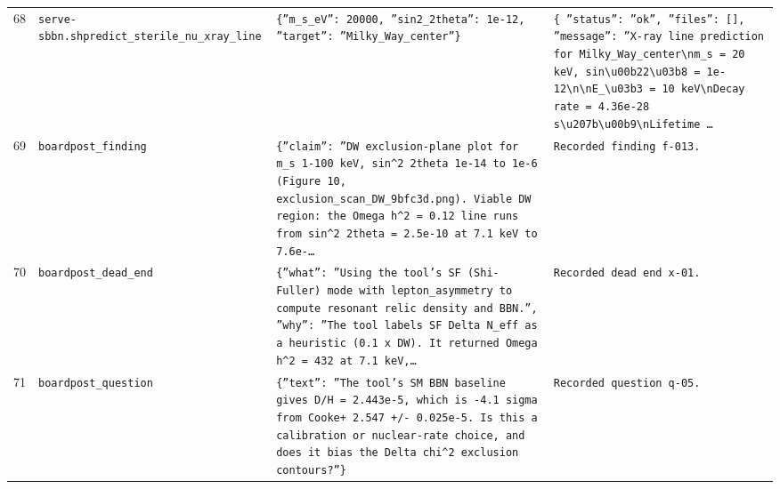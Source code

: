 \documentclass[11pt,a4paper]{article}
\begin{document}
\begin{longtable}{@{}p{}p{}p{}p{}@{}}
68 & \texttt{serve-sbbn.sh}\newline\texttt{predict\_\allowbreak{}sterile\_\allowbreak{}nu\_\allowbreak{}xray\_\allowbreak{}line} & \texttt{\{''m\_\allowbreak{}s\_\allowbreak{}eV'':\allowbreak{} 20000,\allowbreak{} ''sin2\_\allowbreak{}2theta'':\allowbreak{} 1e-12,\allowbreak{} ''target'':\allowbreak{} ''Milky\_\allowbreak{}Way\_\allowbreak{}center''\}\allowbreak{}} & \texttt{\{   ''status'':\allowbreak{} ''ok'',\allowbreak{}   ''files'':\allowbreak{} []\allowbreak{},\allowbreak{}   ''message'':\allowbreak{} ''X-ray line prediction for Milky\_\allowbreak{}Way\_\allowbreak{}center\textbackslash{}\allowbreak{}nm\_\allowbreak{}s =\allowbreak{} 20 keV,\allowbreak{} sin\textbackslash{}\allowbreak{}u00b22\textbackslash{}\allowbreak{}u03b8 =\allowbreak{} 1e-12\textbackslash{}\allowbreak{}n\textbackslash{}\allowbreak{}nE\_\allowbreak{}\textbackslash{}\allowbreak{}u03b3 =\allowbreak{} 10 keV\textbackslash{}\allowbreak{}nDecay rate =\allowbreak{} 4.36e-28 s\textbackslash{}\allowbreak{}u207b\textbackslash{}\allowbreak{}u00b9\textbackslash{}\allowbreak{}nLifetime \ldots{}\allowbreak{}} \\
69 & \texttt{board}\newline\texttt{post\_\allowbreak{}finding} & \texttt{\{''claim'':\allowbreak{} ''DW exclusion-plane plot for m\_\allowbreak{}s 1-100 keV,\allowbreak{} sin\textasciicircum{}\allowbreak{}2 2theta 1e-14 to 1e-6 (Figure 10,\allowbreak{} exclusion\_\allowbreak{}scan\_\allowbreak{}DW\_\allowbreak{}9bfc3d.png)\allowbreak{}. Viable DW region:\allowbreak{} the Omega h\textasciicircum{}\allowbreak{}2 =\allowbreak{} 0.12 line runs from sin\textasciicircum{}\allowbreak{}2 2theta =\allowbreak{} 2.5e-10 at 7.1 keV to 7.6e-\ldots{}\allowbreak{}} & \texttt{Recorded finding f-013.} \\
70 & \texttt{board}\newline\texttt{post\_\allowbreak{}dead\_\allowbreak{}end} & \texttt{\{''what'':\allowbreak{} ''Using the tool's SF (Shi-Fuller)\allowbreak{} mode with lepton\_\allowbreak{}asymmetry to compute resonant relic density and BBN.'',\allowbreak{} ''why'':\allowbreak{} ''The tool labels SF Delta N\_\allowbreak{}eff as a heuristic (0.1 x DW)\allowbreak{}. It returned Omega h\textasciicircum{}\allowbreak{}2 =\allowbreak{} 432 at 7.1 keV,\allowbreak{}\ldots{}\allowbreak{}} & \texttt{Recorded dead end x-01.} \\
71 & \texttt{board}\newline\texttt{post\_\allowbreak{}question} & \texttt{\{''text'':\allowbreak{} ''The tool's SM BBN baseline gives D/\allowbreak{}H =\allowbreak{} 2.443e-5,\allowbreak{} which is -4.1 sigma from Cooke+ 2.547 +/\allowbreak{}- 0.025e-5. Is this a calibration or nuclear-rate choice,\allowbreak{} and does it bias the Delta chi\textasciicircum{}\allowbreak{}2 exclusion contours?''\}\allowbreak{}} & \texttt{Recorded question q-05.} \\

\end{longtable}
\end{document}
